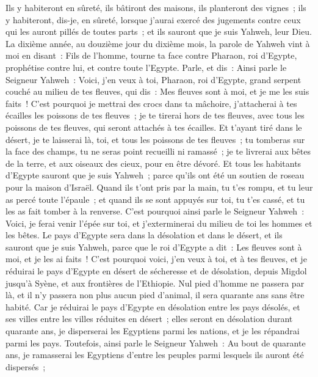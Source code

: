 \begin{multicols}{2}
Ils y habiteront en sûreté, ils bâtiront des maisons, ils planteront des vignes~; ils y habiteront, dis-je, en sûreté, lorsque j'aurai exercé des jugements contre ceux qui les auront pillés de toutes parts~; et ils sauront que je suis Yahweh, leur Dieu.
\VerseOne{}La dixième année, au douzième jour du dixième mois, la parole de Yahweh vint à moi en disant~:
Fils de l'homme, tourne ta face contre Pharaon, roi d'Egypte, prophétise contre lui, et contre toute l'Egypte.
Parle, et dis~: Ainsi parle le Seigneur Yahweh~: Voici, j'en veux à toi, Pharaon, roi d'Egypte, grand serpent couché au milieu de tes fleuves, qui dis~: Mes fleuves sont à moi, et je me les suis faits~!
C'est pourquoi je mettrai des crocs dans ta mâchoire, j'attacherai à tes écailles les poissons de tes fleuves~; je te tirerai hors de tes fleuves, avec tous les poissons de tes fleuves, qui seront attachés à tes écailles.
Et t'ayant tiré dans le désert, je te laisserai là, toi, et tous les poissons de tes fleuves~; tu tomberas sur la face des champs, tu ne seras point recueilli ni ramassé~; je te livrerai aux bêtes de la terre, et aux oiseaux des cieux, pour en être dévoré.
Et tous les habitants d'Egypte sauront que je suis Yahweh~; parce qu'ils ont été un soutien de roseau pour la maison d'Israël.
Quand ils t'ont pris par la main, tu t'es rompu, et tu leur as percé toute l'épaule~; et quand ils se sont appuyés sur toi, tu t'es cassé, et tu les as fait tomber à la renverse.
C'est pourquoi ainsi parle le Seigneur Yahweh~: Voici, je ferai venir l'épée sur toi, et j'exterminerai du milieu de toi les hommes et les bêtes.
Le pays d'Egypte sera dans la désolation et dans le désert, et ils sauront que je suis Yahweh, parce que le roi d'Egypte a dit~: Les fleuves sont à moi, et je les ai faits~!
C'est pourquoi voici, j'en veux à toi, et à tes fleuves, et je réduirai le pays d'Egypte en désert de sécheresse et de désolation, depuis Migdol jusqu'à Syène, et aux frontières de l'Ethiopie.
Nul pied d'homme ne passera par là, et il n'y passera non plus aucun pied d'animal, il sera quarante ans sans être habité.
Car je réduirai le pays d'Egypte en désolation entre les pays désolés, et ses villes entre les villes réduites en désert~; elles seront en désolation durant quarante ans, je disperserai les Egyptiens parmi les nations, et je les répandrai parmi les pays.
Toutefois, ainsi parle le Seigneur Yahweh~: Au bout de quarante ans, je ramasserai les Egyptiens d'entre les peuples parmi lesquels ils auront été dispersés~;

\end{multicols}
